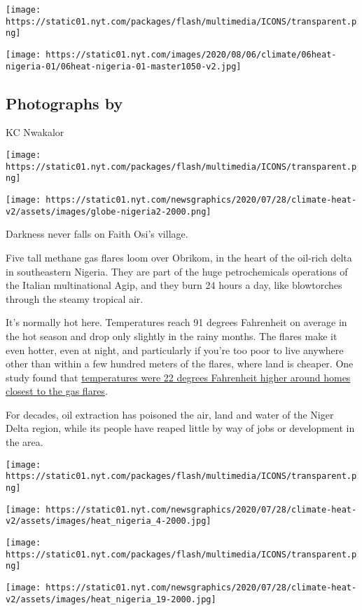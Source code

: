 \texttt{[image: https://static01.nyt.com/packages/flash/multimedia/ICONS/transparent.png]}

\texttt{[image: https://static01.nyt.com/images/2020/08/06/climate/06heat-nigeria-01/06heat-nigeria-01-master1050-v2.jpg]}

\hypertarget{photographs-by-2}{%
\subsection{Photographs by}\label{photographs-by-2}}

KC Nwakalor

\texttt{[image: https://static01.nyt.com/packages/flash/multimedia/ICONS/transparent.png]}

\texttt{[image: https://static01.nyt.com/newsgraphics/2020/07/28/climate-heat-v2/assets/images/globe-nigeria2-2000.png]}

Darkness never falls on Faith Osi's village.

Five tall methane gas flares loom over Obrikom, in the heart of the
oil-rich delta in southeastern Nigeria. They are part of the huge
petrochemicals operations of the Italian multinational Agip, and they
burn 24 hours a day, like blowtorches through the steamy tropical air.

It's normally hot here. Temperatures reach 91 degrees Fahrenheit on
average in the hot season and drop only slightly in the rainy months.
The flares make it even hotter, even at night, and particularly if
you're too poor to live anywhere other than within a few hundred meters
of the flares, where land is cheaper. One study found that
\href{https://www.aaas.org/resources/eyes-nigeria-technical-report/gas-flaring}{temperatures
were 22 degrees Fahrenheit higher around homes closest to the gas
flares}.

For decades, oil extraction has poisoned the air, land and water of the
Niger Delta region, while its people have reaped little by way of jobs
or development in the area.

\texttt{[image: https://static01.nyt.com/packages/flash/multimedia/ICONS/transparent.png]}

\texttt{[image: https://static01.nyt.com/newsgraphics/2020/07/28/climate-heat-v2/assets/images/heat\_nigeria\_4-2000.jpg]}

\texttt{[image: https://static01.nyt.com/packages/flash/multimedia/ICONS/transparent.png]}

\texttt{[image: https://static01.nyt.com/newsgraphics/2020/07/28/climate-heat-v2/assets/images/heat\_nigeria\_19-2000.jpg]}


